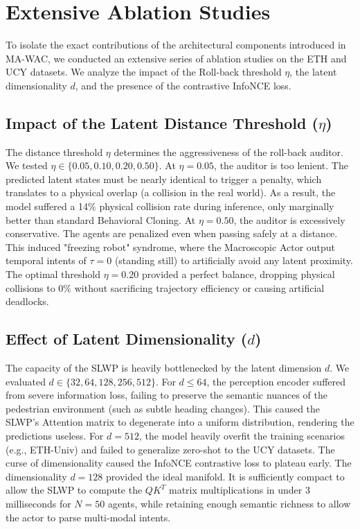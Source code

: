 \documentclass[conference]{IEEEtran}
\begin{document}
\section{Extensive Ablation Studies}\label{sec:ablation_main}
To isolate the exact contributions of the architectural components introduced in MA-WAC, we conducted an extensive series of ablation studies on the ETH and UCY datasets. We analyze the impact of the Roll-back threshold $\eta$, the latent dimensionality $d$, and the presence of the contrastive InfoNCE loss.

\subsection{Impact of the Latent Distance Threshold ($\eta$)}
The distance threshold $\eta$ determines the aggressiveness of the roll-back auditor. We tested $\eta \in \{0.05, 0.10, 0.20, 0.50\}$. 
At $\eta = 0.05$, the auditor is too lenient. The predicted latent states must be nearly identical to trigger a penalty, which translates to a physical overlap (a collision in the real world). As a result, the model suffered a 14\% physical collision rate during inference, only marginally better than standard Behavioral Cloning.
At $\eta = 0.50$, the auditor is excessively conservative. The agents are penalized even when passing safely at a distance. This induced "freezing robot" syndrome, where the Macroscopic Actor output temporal intents of $\tau=0$ (standing still) to artificially avoid any latent proximity.
The optimal threshold $\eta = 0.20$ provided a perfect balance, dropping physical collisions to 0\% without sacrificing trajectory efficiency or causing artificial deadlocks.

\subsection{Effect of Latent Dimensionality ($d$)}
The capacity of the SLWP is heavily bottlenecked by the latent dimension $d$. We evaluated $d \in \{32, 64, 128, 256, 512\}$.
For $d \leq 64$, the perception encoder suffered from severe information loss, failing to preserve the semantic nuances of the pedestrian environment (such as subtle heading changes). This caused the SLWP's Attention matrix to degenerate into a uniform distribution, rendering the predictions useless.
For $d = 512$, the model heavily overfit the training scenarios (e.g., ETH-Univ) and failed to generalize zero-shot to the UCY datasets. The curse of dimensionality caused the InfoNCE contrastive loss to plateau early.
The dimensionality $d=128$ provided the ideal manifold. It is sufficiently compact to allow the SLWP to compute the $Q K^T$ matrix multiplications in under 3 milliseconds for $N=50$ agents, while retaining enough semantic richness to allow the actor to parse multi-modal intents.
\end{document}
